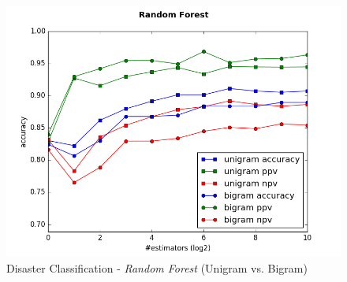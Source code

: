 \documentclass[letterpaper,twocolumn,10pt]{article}
\begin{document}
\begin{table}[H]
	\begin{center}
	\end{center}
	\caption{Disaster Classification Best Results: \textit{Naive Bayes} and \textit{Random Forest}}
\label{tab:disaster_classifiaction_best_results_nb_and_rf}
\end{table}

\begin{table}[H]
	\begin{center}
	\end{center}
	\caption{Disaster Classification Best Results: \textit{SVM}}
\label{tab:disaster_classifiaction_best_results_svm}
\end{table}

\begin{figure}[H]
	\centering
	\includegraphics[trim={0 0 0 1cm},clip,width=\columnwidth]{../graphs/DisasterClassification/random_forest_unigram_vs_bigram_features.png}
	\caption{Disaster Classification - \textit{Random Forest} (Unigram vs. Bigram)}
	\label{fig:disaster_classification_rf}
\end{figure}
\end{document}
